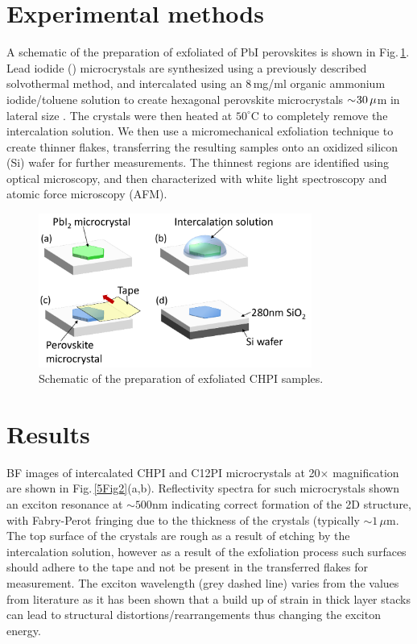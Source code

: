 \section{Experimental methods}
A schematic of the preparation of exfoliated of PbI perovskites is shown in Fig.\,\ref{5Fig1}. Lead iodide () microcrystals are synthesized using a previously described solvothermal method, and intercalated using an 8\,mg/ml organic ammonium iodide/toluene solution to create hexagonal perovskite microcrystals $\sim\negmedspace30\,\mu$m in lateral size \cite{Saikumar2012}. The crystals were then heated at $50^{\circ}$C to completely remove the intercalation solution. We then use a micromechanical exfoliation technique to create thinner flakes, transferring the resulting samples onto an oxidized silicon (Si) wafer for further measurements. The thinnest regions are identified using optical microscopy, and then characterized with white light spectroscopy and atomic force microscopy (AFM).
\begin{figure}[ht] 
\centering    
\includegraphics[width=0.8\textwidth]{Fig1}
\caption{Schematic of the preparation of exfoliated CHPI samples.}
\label{5Fig1}
\end{figure}

\section{Results}
BF images of intercalated CHPI and C12PI microcrystals at 20$\times$ magnification are shown in Fig.\,\ref{5Fig2}(a,b). Reflectivity spectra for such microcrystals shown an exciton resonance at $\sim500$nm indicating correct formation of the 2D structure, with Fabry-Perot fringing due to the thickness of the crystals (typically $\sim1\,\mu$m. The top surface of the crystals are rough as a result of etching by the intercalation solution, however as a result of the exfoliation process such surfaces should adhere to the tape and not be present in the transferred flakes for measurement. The exciton wavelength (grey dashed line) varies from the values from literature as it has been shown that a build up of strain in thick layer stacks can lead to structural distortions/rearrangements \cite{Saikumar2012, VijayaPrakash2009, Pradeesh2009b} thus changing the exciton energy. 


